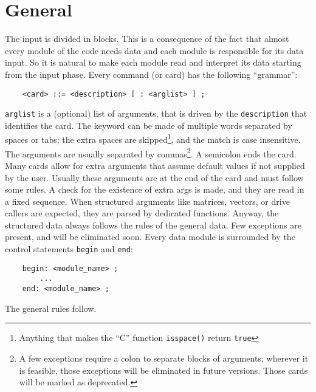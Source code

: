 %
%
%
%
%
% 
%
%

\chapter{General}
The input is divided in blocks. 
This is a consequence of the fact that almost every module of the code 
needs data and each module is responsible for its data input. 
So it is natural to make each module read and interpret its data starting 
from the input phase.
Every command (or card) has the following ``grammar'':
\begin{verbatim}
    <card> ::= <description> [ : <arglist> ] ;
\end{verbatim}
\texttt{arglist} is a (optional) list of arguments, that is driven by the 
\texttt{description} that identifies the card. 
The keyword can be made of multiple words separated by spaces or tabs; 
the extra spaces are skipped\footnote{
    Anything that makes the ``C'' function \texttt{isspace()} return \texttt{true}
}, and the match is case insensitive. 
The arguments are usually separated by commas\footnote{
    A few exceptions require a colon to separate blocks of arguments;
    wherever it is feasible, those exceptions will be eliminated in future
    versions. Those cards will be marked as deprecated.
}.
A semicolon ends the card. 
Many cards allow for extra arguments that assume default values 
if not supplied by the user. 
Usually these arguments are at the end of the card and must follow some 
rules. 
A check for the existence of extra args is made, and they are read in a 
fixed sequence.
When structured arguments like matrices, vectors, or drive callers are
expected, they are parsed by dedicated functions.
Anyway, the structured data always follows the rules of the general data. 
Few exceptions are present, and will be eliminated soon.
Every data module is surrounded by the control statements \texttt{begin} and
\texttt{end}:
\begin{verbatim}
    begin: <module_name> ;
        ...
    end: <module_name> ;
\end{verbatim}
The general rules follow.



